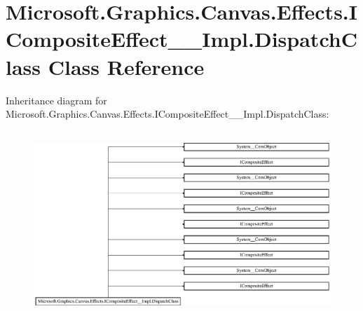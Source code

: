 \hypertarget{class_microsoft_1_1_graphics_1_1_canvas_1_1_effects_1_1_i_composite_effect_____impl_1_1_dispatch_class}{}\section{Microsoft.\+Graphics.\+Canvas.\+Effects.\+I\+Composite\+Effect\+\_\+\+\_\+\+Impl.\+Dispatch\+Class Class Reference}
\label{class_microsoft_1_1_graphics_1_1_canvas_1_1_effects_1_1_i_composite_effect_____impl_1_1_dispatch_class}
Inheritance diagram for Microsoft.\+Graphics.\+Canvas.\+Effects.\+I\+Composite\+Effect\+\_\+\+\_\+\+Impl.\+Dispatch\+Class\+:\begin{figure}[H]
\begin{center}
\leavevmode
\includegraphics[height=7.064220cm]{class_microsoft_1_1_graphics_1_1_canvas_1_1_effects_1_1_i_composite_effect_____impl_1_1_dispatch_class}
\end{center}
\end{figure}
